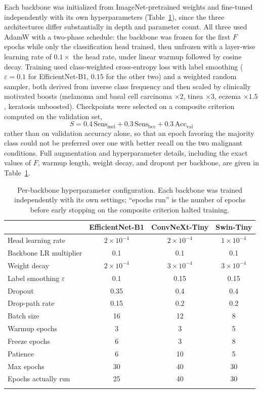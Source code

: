 \documentclass[VANCOUVER,twocolumn]{USG}
\begin{document}
Each backbone was initialized from ImageNet-pretrained weights and
fine-tuned independently with its own hyperparameters
(Table~\ref{tab:hyperparams}), since the three architectures differ
substantially in depth and parameter count. All three used AdamW
\cite{ref26} with a two-phase schedule: the backbone was frozen for the
first $F$ epochs while only the classification head trained, then
unfrozen with a layer-wise learning rate of $0.1\times$ the head rate,
under linear warmup followed by cosine decay. Training used class-weighted
cross-entropy loss with label smoothing ($\varepsilon=0.1$ for
EfficientNet-B1, $0.15$ for the other two) and a weighted random sampler,
both derived from inverse class frequency and then scaled by clinically
motivated boosts (melanoma and basal cell carcinoma $\times2$, tinea
$\times3$, eczema $\times1.5$, keratosis unboosted). Checkpoints were
selected on a composite criterion computed on the validation set,
\begin{equation}
S = 0.4\,\mathrm{Sens}_{\mathrm{mel}} + 0.3\,\mathrm{Sens}_{\mathrm{bcc}} + 0.3\,\mathrm{Acc}_{\mathrm{val}}
\end{equation}
rather than on validation accuracy alone, so that an epoch favoring the
majority class could not be preferred over one with better recall on the
two malignant conditions. Full augmentation and hyperparameter details,
including the exact values of $F$, warmup length, weight decay, and
dropout per backbone, are given in Table~\ref{tab:hyperparams}.

\begin{table}[htbp]
\caption{Per-backbone hyperparameter configuration. Each backbone was
trained independently with its own settings; ``epochs run'' is the number
of epochs before early stopping on the composite criterion halted
training.}\label{tab:hyperparams}
\begin{tabular}{@{}lccc@{}}
\toprule
& EfficientNet-B1 & ConvNeXt-Tiny & Swin-Tiny \\
\midrule
Head learning rate & $2 \times 10^{-4}$ & $2 \times 10^{-4}$ & $1 \times 10^{-4}$ \\
Backbone LR multiplier & 0.1 & 0.1 & 0.1 \\
Weight decay & $2 \times 10^{-4}$ & $3 \times 10^{-4}$ & $3 \times 10^{-4}$ \\
Label smoothing $\varepsilon$ & 0.1 & 0.15 & 0.15 \\
Dropout & 0.35 & 0.4 & 0.4 \\
Drop-path rate & 0.15 & 0.2 & 0.2 \\
Batch size & 16 & 12 & 8 \\
Warmup epochs & 3 & 3 & 5 \\
Freeze epochs & 6 & 3 & 8 \\
Patience & 6 & 10 & 5 \\
Max epochs & 30 & 40 & 30 \\
Epochs actually run & 25 & 40 & 30 \\
\botrule
\end{tabular}
\end{table}
\end{document}
